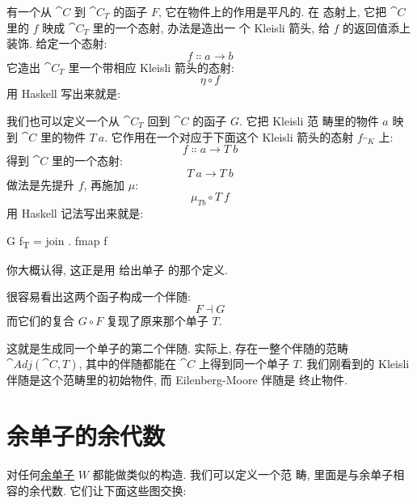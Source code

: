 有一个从 $\cat{C}$ 到 $\cat{C}_T$ 的函子 $F$, 它在物件上的作用是平凡的. 在
态射上, 它把 $\cat{C}$ 里的 $f$ 映成 $\cat{C}_T$ 里的一个态射, 办法是造出一
个 Kleisli 箭头, 给 $f$ 的返回值添上装饰. 给定一个态射:
\[f \Colon a \to b\]
它造出 $\cat{C}_T$ 里一个带相应 Kleisli 箭头的态射:
\[\eta \circ f\]
用 Haskell 写出来就是:

我们也可以定义一个从 $\cat{C}_T$ 回到 $\cat{C}$ 的函子 $G$. 它把 Kleisli 范
畴里的物件 $a$ 映到 $\cat{C}$ 里的物件 $T\ a$. 它作用在一个对应于下面这个
Kleisli 箭头的态射 $f_{\cat{K}}$ 上:
\[f \Colon a \to T\ b\]
得到 $\cat{C}$ 里的一个态射:
\[T\ a \to T\ b\]
做法是先提升 $f$, 再施加 $\mu$:
\[\mu_{T b} \circ T\ f\]
用 Haskell 记法写出来就是:

\begin{snipv}
G f\textsubscript{T} = join . fmap f
\end{snipv}
你大概认得, 这正是用  给出单子  的那个定义.

很容易看出这两个函子构成一个伴随:
\[F \dashv G\]
而它们的复合 $G \circ F$ 复现了原来那个单子 $T$.

这就是生成同一个单子的第二个伴随. 实际上, 存在一整个伴随的范畴
$\cat{Adj}(\cat{C}, T)$, 其中的伴随都能在 $\cat{C}$ 上得到同一个单子 $T$.
我们刚看到的 Kleisli 伴随是这个范畴里的初始物件, 而 Eilenberg-Moore 伴随是
终止物件.

\section{余单子的余代数}

对任何\hyperref[comonads]{余单子} $W$ 都能做类似的构造. 我们可以定义一个范
畴, 里面是与余单子相容的余代数. 它们让下面这些图交换:

\begin{figure}[H]
  \centering
  \begin{subfigure}
    \centering
  \end{subfigure}%
  \hspace{1cm}
  \begin{subfigure}
    \centering
  \end{subfigure}
\end{figure}


